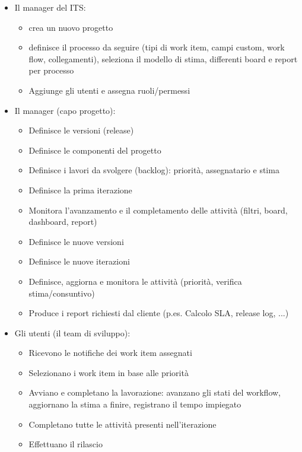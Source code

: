 \documentclass[10pt, a4paper]{article}
\begin{document}
\begin{itemize}
\item Il manager del ITS: 
	\begin{itemize}
	\item crea un nuovo progetto
	\item definisce il processo da seguire (tipi di work item, campi custom, work flow, collegamenti), seleziona il modello di stima, differenti board e report per processo
	\item Aggiunge gli utenti e assegna ruoli/permessi
	\end{itemize}
	
\item Il manager (capo progetto):
	\begin{itemize}
	\item Definisce le versioni (release)
	\item Definisce le componenti del progetto
	\item Definisce i lavori da svolgere (backlog): priorità, assegnatario e stima
	\item Definisce la prima iterazione
	\item Monitora l’avanzamento e il completamento delle attività (filtri, board, dashboard, report)
	\item Definisce le nuove versioni
	\item Definisce le nuove iterazioni
	\item Definisce, aggiorna e monitora le attività (priorità, verifica stima/consuntivo)
	\item Produce i report richiesti dal cliente (p.es. Calcolo SLA, release log, ...)
	\end{itemize}	 
	
\item Gli utenti (il team di sviluppo):
	\begin{itemize}
	\item Ricevono le notifiche dei work item assegnati
	\item Selezionano i work item in base alle priorità
	\item Avviano e completano la lavorazione: avanzano gli stati del workflow, aggiornano la stima a finire, registrano il tempo impiegato
	\item Completano tutte le attività presenti nell'iterazione
	\item Effettuano il rilascio
	\end{itemize}
\end{itemize}
\end{document}
